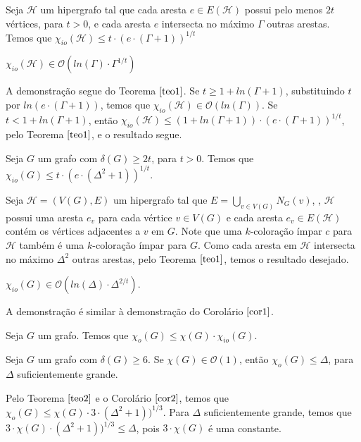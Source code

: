\begin{teo}
	\label{teo1} 
	Seja $\mathcal{H}$ um hipergrafo tal que cada aresta $e \in E(\mathcal{H})$ possui pelo menos $2t$ vértices, para $t > 0$, e cada aresta $e$ intersecta no máximo $\Gamma$ outras arestas. Temos que $\chi_{io}(\mathcal{H}) \leq t {\cdot} (e {\cdot} (\Gamma + 1))^{1/t}$
\end{teo} \newbegin 

\begin{cor} 
	\label{cor1}  
	$\chi_{io}(\mathcal{H}) \in \mathcal{O}(ln(\Gamma) {\cdot} \Gamma^{1/t})$
\end{cor}

A demonstração segue do Teorema $\ref{teo1}$. Se $t \geq 1 + ln (\Gamma + 1)$, substituindo $t$ por $ln(e {\cdot} (\Gamma + 1))$, temos que $\chi_{io}(\mathcal{H}) \in \mathcal{O}(ln(\Gamma))$. Se $t < 1 + ln (\Gamma + 1)$, então $\chi_{io}(\mathcal{H}) \leq (1 + ln (\Gamma + 1)) {\cdot} (e {\cdot} (\Gamma + 1))^{1/t}$, pelo Teorema $\ref{teo1}$, e o resultado segue. \newbegin

\begin{cor}
	\label{cor2}  
	Seja $G$ um grafo com $\delta(G) \geq 2t$, para $t > 0$. Temos que $\chi_{io}(G) \leq t {\cdot} (e {\cdot} (\Delta^2 + 1))^{1/t}$.
\end{cor}

Seja $\mathcal{H} = (V(G), E)$ um hipergrafo tal que $E = \bigcup\limits_{v \in V(G)}N_G(v)$, \ie, $\mathcal{H}$ possui uma aresta $e_v$ para cada vértice $v \in V(G)$ e cada aresta $e_v \in E(\mathcal{H})$ contém os vértices adjacentes a $v$ em $G$. Note que uma $k$-coloração  ímpar $c$ para $\mathcal{H}$ também é uma $k$-coloração ímpar para $G$. Como cada aresta em $\mathcal{H}$ intersecta no máximo $\Delta^2$ outras arestas, pelo Teorema $\ref{teo1}$, temos o resultado desejado. \newbegin

\begin{cor}
	\label{cor3}  
	$\chi_{io}(G) \in \mathcal{O}(ln(\Delta) {\cdot} \Delta^{2/t})$.
\end{cor} 
A demonstração é similar à demonstração do Corolário $\ref{cor1}$.
\newbegin

\begin{teo}
	\label{teo2}  
	Seja $G$ um grafo. Temos que $\chi_o(G) \leq \chi(G) {\cdot} \chi_{io}(G)$.
\end{teo} \newbegin 

\begin{cor}
	Seja $G$ um grafo com $\delta(G) \geq 6$. Se $\chi(G) \in \mathcal{O}(1)$, então $\chi_o(G) \leq \Delta$, para $\Delta$ suficientemente grande.
\end{cor}
Pelo Teorema $\ref{teo2}$ e o Corolário $\ref{cor2}$, temos que $\chi_o(G) \leq \chi(G) {\cdot} 3 {\cdot} (\Delta^2 + 1))^{1/3}$. Para $\Delta$ suficientemente grande, temos que $3 {\cdot} \chi(G) {\cdot} (\Delta^2 + 1))^{1/3} \leq \Delta$, pois $3 {\cdot} \chi(G) $ é uma constante.\newbegin

